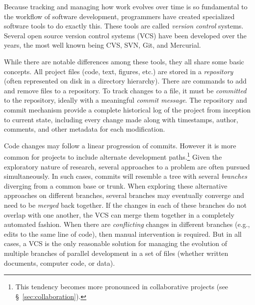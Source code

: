 \documentclass[ChapterTOCs,krantz2]{krantz} %
\begin{document}
Because tracking and managing how work evolves over time is so fundamental to
the workflow of software development, programmers have created specialized
software tools to do exactly this. These tools are called \emph{version
  control} systems. Several open source version control systems (VCS) have been
developed over the years, the most well known being CVS, SVN, Git, and
Mercurial.

While there are notable differences among these tools, they all share some
basic concepts.  All project files (code, text, figures, etc.) are stored in a
\emph{repository} (often represented on disk in a directory hierarchy).  There
are commands to add and remove files to a repository.  To track changes to a
file, it must be \emph{committed} to the repository, ideally with a meaningful
\emph{commit message}.  The repository and commit mechanism provide a complete
historical log of the project from inception to current state, including every
change made along with timestamps, author, comments, and other metadata for each
modification.

Code changes may follow a linear progression of commits.  However it is more
common for projects to include alternate development paths.\footnote{This
tendency becomes more pronounced in collaborative projects (see
§~\ref{sec:collaboration}).} Given the exploratory nature of research, several
approaches to a problem are often pursued simultaneously. In such cases,
commits will resemble a tree with several \emph{branches} diverging from a
common base or trunk. When exploring these alternative approaches on different
branches, several branches may eventually converge and need to be \emph{merged}
back together.  If the changes in each of these branches do not overlap with
one another, the VCS can merge them together in a completely automated fashion.
When there are \emph{conflicting} changes in different branches (e.g., edits to
the same line of code), then manual intervention is required.  But in all
cases, a VCS is the only reasonable solution for managing the evolution of
multiple branches of parallel development in a set of files (whether written
documents, computer code, or data).
\end{document}
